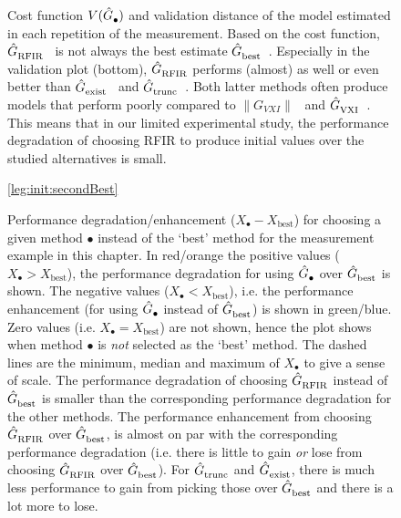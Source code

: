 \begin{figure}
  \centering
  \setlength{\figurewidth}{0.85\columnwidth}
  \setlength{\figureheight}{0.68\figurewidth}
  
  \caption[$\costFunc{\bullet}$ and $\validationDistance{\bullet}$ for each repeated measurement.]{Cost function $V(\hat{G}_{\mathrm{\bullet}}^{\mathrm{}})$ and validation distance of the model estimated in each repetition of the measurement.
  Based on the cost function, $\hat{G}_{\mathrm{RFIR}}^{\mathrm{}}$~ is not always the best estimate $\hat{G}_{\mathrm{best}}^{\mathrm{}}$~.
  Especially in the validation plot (bottom), $\hat{G}_{\mathrm{RFIR}}^{\mathrm{}}$ performs (almost) as well or even better than $\hat{G}_{\mathrm{exist}}^{\mathrm{}}$~ and $\hat{G}_{\mathrm{trunc}}^{\mathrm{}}$~.
  Both latter methods often produce models that perform poorly compared to $\| G_{VXI} \|$~ and $\hat{G}_{\mathrm{VXI}}^{\mathrm{}}$~.
  This means that in our limited experimental study, the performance degradation of choosing RFIR to produce initial values over the studied alternatives is small.}
  \label{fig:overview}
\end{figure}

\begin{figure}
  \centering
  \ref{leg:init:secondBest}
  \setlength{\figurewidth}{0.75\columnwidth}
  \setlength{\figureheight}{0.60\figurewidth}
  
  \caption[Performance degradation/enhancement for selecting the second best model.]{
  Performance degradation/enhancement ($X_{\bullet}-X_{\mathrm{best}}$) for choosing a given method $\bullet$ instead of the `best' method for the measurement example in this chapter.
  In red/orange the positive values ($X_{\bullet} > X_{\mathrm{best}}$), the performance degradation for using $\hat{G}_{\mathrm{\bullet}}^{\mathrm{}}$ over $\hat{G}_{\mathrm{best}}^{\mathrm{}}$ is shown.
  The negative values ($X_{\bullet} < X_{\mathrm{best}}$), i.e. the performance enhancement (for using $\hat{G}_{\mathrm{\bullet}}^{\mathrm{}}$ instead of $\hat{G}_{\mathrm{best}}^{\mathrm{}}$) is shown in green/blue.
  Zero values (i.e. $X_{\bullet} = X_{\mathrm{best}}$) are not shown, hence the plot shows when method $\bullet$ is \emph{not} selected as the `best' method.
  The dashed lines are the minimum, median and maximum of $X_{\bullet}$ to give a sense of scale.
  The performance degradation of choosing $\hat{G}_{\mathrm{RFIR}}^{\mathrm{}}$ instead of $\hat{G}_{\mathrm{best}}^{\mathrm{}}$ is smaller than the corresponding performance degradation for the other methods.
  The performance enhancement from choosing $\hat{G}_{\mathrm{RFIR}}^{\mathrm{}}$ over $\hat{G}_{\mathrm{best}}^{\mathrm{}}$, is almost on par with the corresponding performance degradation (i.e. there is little to gain \emph{or} lose from choosing $\hat{G}_{\mathrm{RFIR}}^{\mathrm{}}$ over $\hat{G}_{\mathrm{best}}^{\mathrm{}}$).
  For $\hat{G}_{\mathrm{trunc}}^{\mathrm{}}$ and $\hat{G}_{\mathrm{exist}}^{\mathrm{}}$, there is much less performance to gain from picking those over $\hat{G}_{\mathrm{best}}^{\mathrm{}}$ and there is a lot more to lose.
  }
  \label{fig:init:histogramEnhancement}
\end{figure}

